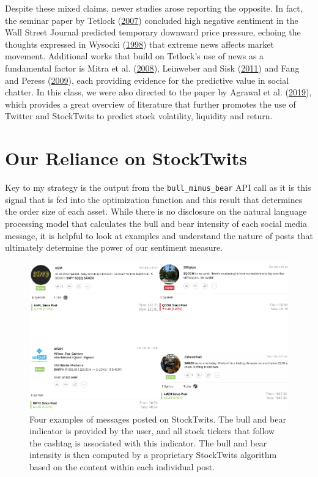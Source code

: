 \documentclass[11,]{article}
\begin{document}
Despite these mixed claims, newer studies arose reporting the opposite.
In fact, the seminar paper by Tetlock
(\protect\hyperlink{ref-tetlock2007}{2007}) concluded high negative
sentiment in the Wall Street Journal predicted temporary downward price
pressure, echoing the thoughts expressed in Wysocki
(\protect\hyperlink{ref-wysocki1998}{1998}) that extreme news affects
market movement. Additional works that build on Tetlock's use of news as
a fundamental factor is Mitra et al.
(\protect\hyperlink{ref-mitra2008}{2008}), Leinweber and Sisk
(\protect\hyperlink{ref-leinweber2011}{2011}) and Fang and Peress
(\protect\hyperlink{ref-fang2009}{2009}), each providing evidence for
the predictive value in social chatter. In this class, we were also
directed to the paper by Agrawal et al.
(\protect\hyperlink{ref-agrawal2019}{2019}), which provides a great
overview of literature that further promotes the use of Twitter and
StockTwits to predict stock volatility, liquidity and return.

\hypertarget{our-reliance-on-stocktwits}{%
\section{Our Reliance on StockTwits}\label{our-reliance-on-stocktwits}}

Key to my strategy is the output from the \texttt{bull\_minus\_bear} API
call as it is this signal that is fed into the optimization function and
this result that determines the order size of each asset. While there is
no disclosure on the natural language processing model that calculates
the bull and bear intensity of each social media message, it is helpful
to look at examples and understand the nature of posts that ultimately
determine the power of our sentiment measure.

\begin{figure}

{\centering \includegraphics[width=0.8\linewidth]{cahoon_final_paper_files/figure-latex/unnamed-chunk-2-1} 

}

\caption{\label{StockT}Four examples of messages posted on StockTwits. The bull and bear indicator is provided by the user, and all stock tickers that follow the cashtag is associated with this indicator. The bull and bear intensity is then computed by a proprietary StockTwits algorithm based on the content within each individual post.}\label{fig:unnamed-chunk-2}
\end{figure}
\end{document}
